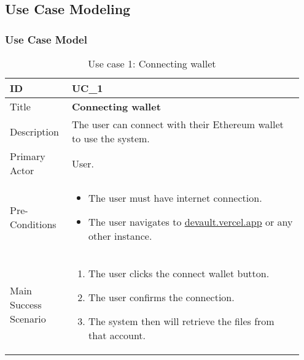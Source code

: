 
\subsection{Use Case Modeling}

\subsubsection{Use Case Model}

\begin{longtable}{p{0.20\linewidth} | p{0.75\linewidth}}
  \caption{Use case 1: Connecting wallet}
  \label{tab:useCaseConnect}
  \\\toprule
  ID & UC\_1
  \\\midrule
  Title & \textbf{Connecting wallet}
  \\\hline
  Description & The user can connect with their Ethereum wallet to use the system.
  \\\hline
  Primary Actor & User.
  \\\hline
  Pre-Conditions & {
    \begin{itemize}
    \item The user must have internet connection.
    \item The user navigates to \url{devault.vercel.app} or any other instance.
    \end{itemize}
  }\vspace*{-\baselineskip}
  \\\hline
  Main Success Scenario & {
    \begin{enumerate}
    \item The user clicks the connect wallet button.
    \item The user confirms the connection.
    \item The system then will retrieve the files from that account.
    \end{enumerate}
  }\vspace*{-\baselineskip}
  \\\bottomrule
\end{longtable}


